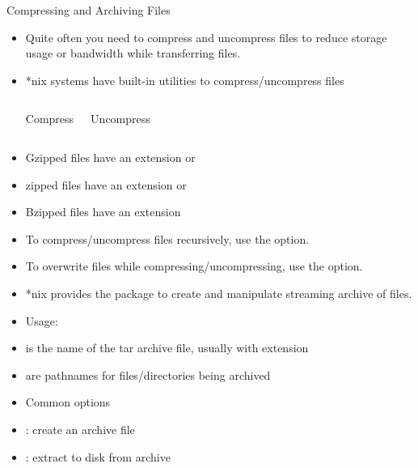 \documentclass[10pt,t]{beamer}
\begin{document}
\begin{frame}{Compressing and Archiving Files}
  \begin{itemize}
    \item Quite often you need to compress and uncompress files to reduce storage usage or bandwidth while transferring files.
    \item *nix systems have built-in utilities to compress/uncompress files
      \begin{columns}
        \begin{exampleblock}{Compress}
          \\
        \end{exampleblock}
        \begin{exampleblock}{Uncompress}
          \\
        \end{exampleblock}
      \end{columns}
    \item Gzipped files have an extension  or 
    \item zipped files have an extension  or 
    \item Bzipped files have an extension 
    \item To compress/uncompress files recursively, use the  option.
    \item To overwrite files while compressing/uncompressing, use the  option.
      \framebreak
    \item *nix provides the  package to create and manipulate streaming archive of files.
    \item Usage: 
    \item[]  is the name of the tar archive file, usually with extension 
    \item[]  are pathnames for files/directories being archived
    \item Common options
    \item[] : create an archive file
    \item[] : extract to disk from archive

\end{itemize}
\end{frame}
\end{document}
